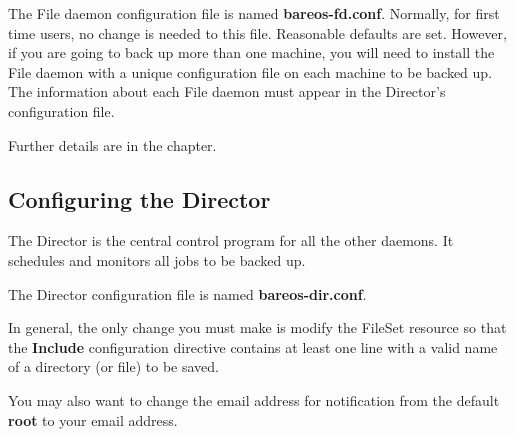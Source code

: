 The File daemon configuration file is named {\bf
bareos-fd.conf}. Normally, for first time users, no change is needed to this
file. Reasonable defaults are set. However, if you are going to back up more
than one machine, you will need to install the File daemon with a unique
configuration file on each machine to be backed up. The information about each
File daemon must appear in the Director's configuration file.

Further details are in the
 chapter.

\subsection{Configuring the Director}

The Director is the central control program for all the other daemons. It
schedules and monitors all jobs to be backed up.

The Director configuration file is named {\bf bareos-dir.conf}.

In general, the only change you must make is modify the FileSet resource so
that the {\bf Include} configuration directive contains at least one line with
a valid name of a directory (or file) to be saved.


You may also want to change the email address for notification from the
default {\bf root} to your email address.

